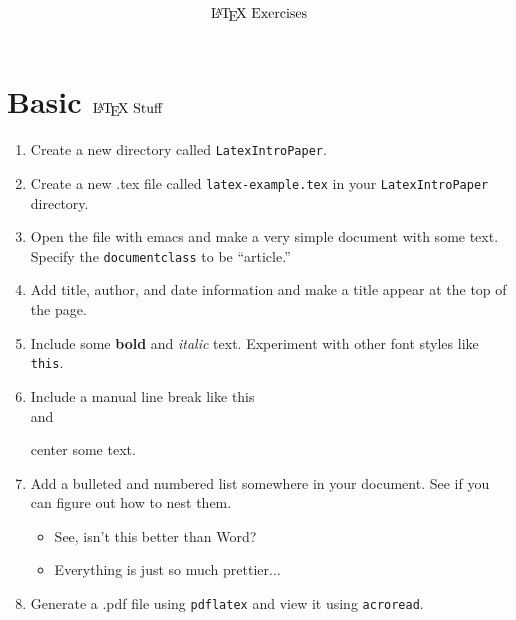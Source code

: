 \documentclass[12pt, a4paper]{article}
\begin{document}
    \title{$\textrm{\LaTeX \  Exercises}$}
    
    \date{}
    \maketitle
    \section{Basic $\textrm{\LaTeX} \textrm { Stuff}$}
    \begin{enumerate}
    \item Create a new directory called \texttt{LatexIntroPaper}.
    \item Create a new .tex ﬁle called \texttt{latex-example.tex} in your \texttt{LatexIntroPaper} directory.
    \item Open the file with emacs and make a very simple document with some text. Specify the \texttt{documentclass} to be “article.”
    \item Add title, author, and date information and make a title appear at the top of the page.
    \item Include some \textbf{bold} and \textit{italic} text. Experiment with other font styles like \texttt{this}.
    \item Include a manual line break like this \\ and \\
    \begin{center}
       center some text.
    \end{center}
    \item Add a bulleted and numbered list somewhere in your document. See if you can figure out how to nest them. 
    \begin{itemize}
        \item See, isn’t this better than Word? 
        \item Everything is just so much prettier... 
    \end{itemize}
    \item Generate a .pdf ﬁle using \texttt{pdflatex} and view it using \texttt{acroread}.
    \end{enumerate}
\end{document}

